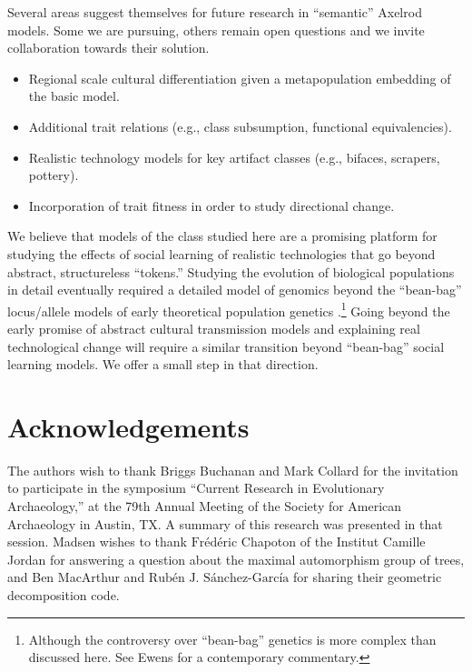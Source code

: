 \documentclass[graybox,natbib]{svmult}
\begin{document}
Several areas suggest themselves for future research in ``semantic''
Axelrod models. Some we are pursuing, others remain open questions and
we invite collaboration towards their solution.

\begin{itemize}
\itemsep1pt\parskip0pt
\item
  Regional scale cultural differentiation given a metapopulation
  embedding of the basic model.
\item
  Additional trait relations (e.g., class subsumption, functional
  equivalencies).
\item
  Realistic technology models for key artifact classes (e.g., bifaces,
  scrapers, pottery).
\item
  Incorporation of trait fitness in order to study directional change.
\end{itemize}

We believe that models of the class studied here are a promising
platform for studying the effects of social learning of realistic
technologies that go beyond abstract, structureless ``tokens.'' Studying
the evolution of biological populations in detail eventually required a
detailed model of genomics beyond the ``bean-bag'' locus/allele models
of early theoretical population genetics \citep{mayr1959mayr}.\footnote{Although
  the controversy over ``bean-bag'' genetics is more complex than
  discussed here. See Ewens \citeyearpar{ewens2008commentary} for a
  contemporary commentary.} Going beyond the early promise of abstract
cultural transmission models and explaining real technological change
will require a similar transition beyond ``bean-bag'' social learning
models. We offer a small step in that direction.

\section{Acknowledgements}\label{acknowledgements}

The authors wish to thank Briggs Buchanan and Mark Collard for the
invitation to participate in the symposium ``Current Research in
Evolutionary Archaeology,'' at the 79th Annual Meeting of the Society
for American Archaeology in Austin, TX. A summary of this research was
presented in that session. Madsen wishes to thank
$\textrm{Fr\'ed\'eric}$ Chapoton of the Institut Camille Jordan for
answering a question about the maximal automorphism group of trees, and
Ben MacArthur and $\textrm{Rub\'en J. S\'anchez-Garc\'ia}$ for sharing
their geometric decomposition code.
\end{document}
